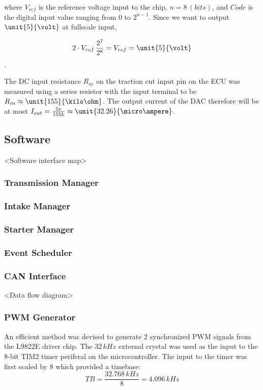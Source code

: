 where $V_{ref}$ is the reference voltage input to the chip, $n=8\,(bits)$, and $Code$ is the digital input value ranging from $0$ to $2^{n-1}$. Since we want to output $\unit{5}{\volt}$ at fullscale input,

\begin{equation}
2\cdot{V_{ref}}\,\frac{2^{7}}{2^{8}}=V_{ref}=\unit{5}{\volt}
\end{equation}.

The DC input resistance $R_{in}$ on the traction cut input pin on the ECU was measured using a series resistor with the input terminal to be $R_{in}\approx\unit{155}{\kilo\ohm}$. The output current of the DAC therefore will be at most $I_{out}=\frac{5v}{155k}\approx\unit{32.26}{\micro\ampere}$.

\subsection{Software}

<Software interface map>


\subsubsection{Transmission Manager}


\subsubsection{Intake Manager}


\subsubsection{Starter Manager}


\subsubsection{Event Scheduler}


\subsubsection{CAN Interface}

<Data flow diagram>


\subsubsection{PWM Generator}

An efficient method was devised to generate 2 synchronized PWM signals from the L9822E driver chip. The $32\, kHz$ external crystal was used as the input to the 8-bit TIM2 timer periferal on the microcontroller. The input to the timer was first scaled by 8 which provided a timebase:
\begin{equation}
TB=\frac{32.768\, kHz}{8}=4.096\, kHz
\end{equation}

